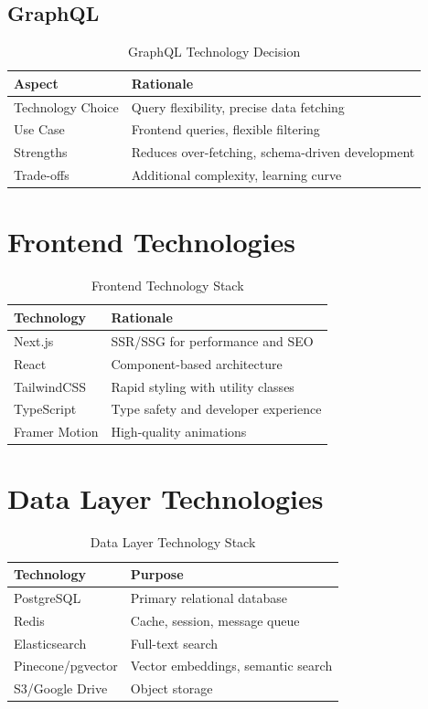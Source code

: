 \documentclass[12pt,a4paper]{report}
\begin{document}
\subsection{GraphQL}

\begin{table}[H]
\centering
\small
\begin{tabular}{|l|p{5cm}|}
\hline
\textbf{Aspect} & \textbf{Rationale} \\
\hline
Technology Choice & Query flexibility, precise data fetching \\
Use Case & Frontend queries, flexible filtering \\
Strengths & Reduces over-fetching, schema-driven development \\
Trade-offs & Additional complexity, learning curve \\
\hline
\end{tabular}
\caption{GraphQL Technology Decision}
\end{table}

\section{Frontend Technologies}

\begin{table}[H]
\centering
\small
\begin{tabular}{|l|p{5cm}|}
\hline
\textbf{Technology} & \textbf{Rationale} \\
\hline
Next.js & SSR/SSG for performance and SEO \\
React & Component-based architecture \\
TailwindCSS & Rapid styling with utility classes \\
TypeScript & Type safety and developer experience \\
Framer Motion & High-quality animations \\
\hline
\end{tabular}
\caption{Frontend Technology Stack}
\end{table}

\section{Data Layer Technologies}

\begin{table}[H]
\centering
\small
\begin{tabular}{|l|l|}
\hline
\textbf{Technology} & \textbf{Purpose} \\
\hline
PostgreSQL & Primary relational database \\
Redis & Cache, session, message queue \\
Elasticsearch & Full-text search \\
Pinecone/pgvector & Vector embeddings, semantic search \\
S3/Google Drive & Object storage \\
\hline
\end{tabular}
\caption{Data Layer Technology Stack}
\end{table}
\end{document}
